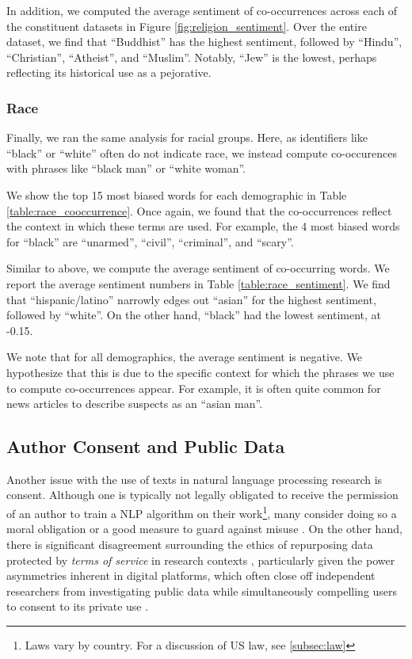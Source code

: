 In addition, we computed the average sentiment of co-occurrences across each of the constituent datasets in Figure \ref{fig:religion_sentiment}. Over the entire dataset, we find that ``Buddhist'' has the highest sentiment, followed by ``Hindu'',  ``Christian'', ``Atheist'', and ``Muslim''. Notably, ``Jew'' is the lowest, perhaps reflecting its historical use as a pejorative.

\subsubsection{Race}
Finally, we ran the same analysis for racial groups. Here, as identifiers like ``black'' or ``white'' often do not indicate race, we instead compute co-occurences with phrases like ``black man'' or ``white woman''.

We show the top 15 most biased words for each demographic in Table \ref{table:race_cooccurrence}. Once again, we found that the co-occurrences reflect the context in which these terms are used. For example, the 4 most biased words for ``black'' are ``unarmed'', ``civil'', ``criminal'', and ``scary''.

Similar to above, we compute the average sentiment of co-occurring words. We report the average sentiment numbers in Table \ref{table:race_sentiment}. We find that ``hispanic/latino'' narrowly edges out ``asian'' for the highest sentiment, followed by ``white''. On the other hand, ``black'' had the lowest sentiment, at -0.15.

We note that for all demographics, the average sentiment is negative. We hypothesize that this is due to the specific context for which the phrases we use to compute co-occurrences appear. For example, it is often quite common for news articles to describe suspects as an ``asian man''.

\subsection{Author Consent and Public Data}

Another issue with the use of texts in natural language processing research is consent. Although one is typically not legally obligated to receive the permission of an author to train a NLP algorithm on their work\footnote{Laws vary by country. For a discussion of US law, see \ref{subsec:law}}, many consider doing so a moral obligation or a good measure to guard against misuse \citep{ethics-consent,pyrrhic-cv}. On the other hand, there is significant disagreement surrounding the ethics of repurposing data protected by \textit{terms of service} in research contexts \cite{beyondthebelmont, norobots}, particularly given the power asymmetries inherent in digital platforms, which often close off independent researchers from investigating public data while simultaneously compelling users to consent to its private use \cite{overcomingtos}.

